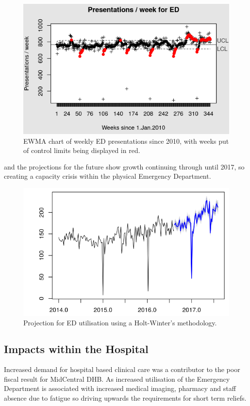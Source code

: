 \documentclass[11pt,a4paper]{article}
\begin{document}
\begin{figure}[htp]
\centering
\includegraphics[scale=0.70]{EWMA_ED_pesentations.png}
\caption{EWMA chart of weekly ED presentations since 2010, with weeks put of control limits being displayed in red.}
\label{EWMA statistical process chart of ED presentations}
\end{figure}

and the projections for the future show growth continuing through until 2017, so creating a capacity crisis within the physical Emergency Department.\\

\begin{figure}[htp]
\centering
\includegraphics[scale=0.70]{HW_projections.png}
\caption{Projection for ED utilisation using a Holt-Winter's methodology.}
\label{Projections for ED utilisation through to 2017}
\end{figure}

\subsection{Impacts within the Hospital}
Increased demand for hospital based clinical care was a contributor to the poor fiscal result for MidCentral DHB. As increased utilisation of the Emergency Department is associated with increased medical imaging, pharmacy and staff absence due to fatigue so driving upwards the requirements for short term reliefs.\\
\end{document}
